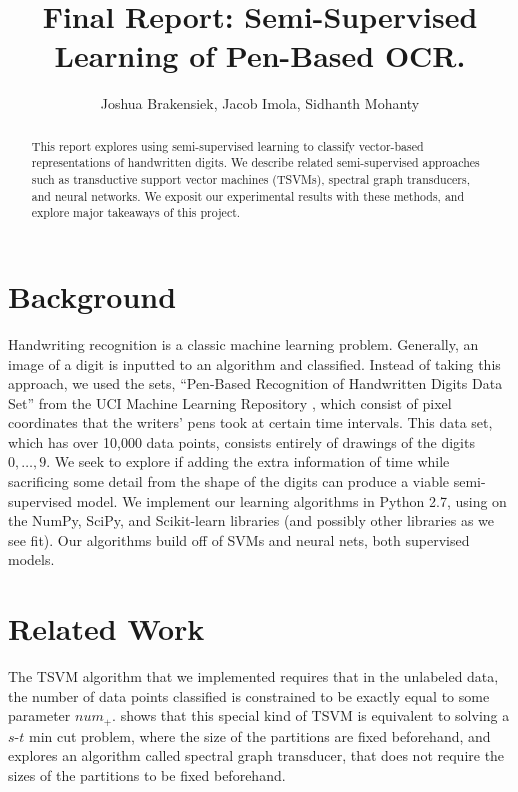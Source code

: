 \documentclass[11pt]{article}
\title{Final Report: Semi-Supervised Learning of Pen-Based OCR.}
\author{Joshua Brakensiek, Jacob Imola, Sidhanth Mohanty}
\begin{document}
\maketitle

\begin{abstract}

  This report explores using semi-supervised learning to classify vector-based representations of handwritten digits. We describe related semi-supervised approaches such as transductive support vector machines (TSVMs), spectral graph transducers, and neural networks. We exposit our experimental results with these methods, and explore major takeaways of this project.

\end{abstract}



\newcommand{\Seq}{\operatorname{Seq}}

\section{Background}

Handwriting recognition is a classic machine learning problem. Generally, an image of a digit is inputted to an algorithm and classified. Instead of taking this approach, we used the sets,  ``Pen-Based Recognition of Handwritten Digits Data Set'' \cite{Alpaydin:1998} from the UCI Machine Learning Repository \cite{Lichman:2013}, which consist of pixel coordinates that the writers' pens took at certain time intervals. This data set, which has over 10,000 data points, consists entirely of drawings of the digits $0, \hdots, 9$. We seek to explore if adding the extra information of time while sacrificing some detail from the shape of the digits can produce a viable semi-supervised model.  We implement our learning algorithms in Python 2.7, using on the NumPy, SciPy, and Scikit-learn libraries (and possibly other libraries as we see fit). Our algorithms build off of SVMs and neural nets, both supervised models.

\section{Related Work}

The TSVM algorithm that we implemented requires that in the unlabeled
data, the number of data points classified is constrained to be
exactly equal to some parameter $num_+$. \cite{joachims2003transductive}
shows that this special kind of TSVM is equivalent to solving
a $s$-$t$ min cut problem, where the size of the partitions are fixed beforehand, and explores an algorithm called spectral graph transducer,
that does not require the sizes of the partitions to be fixed beforehand.
\end{document}
